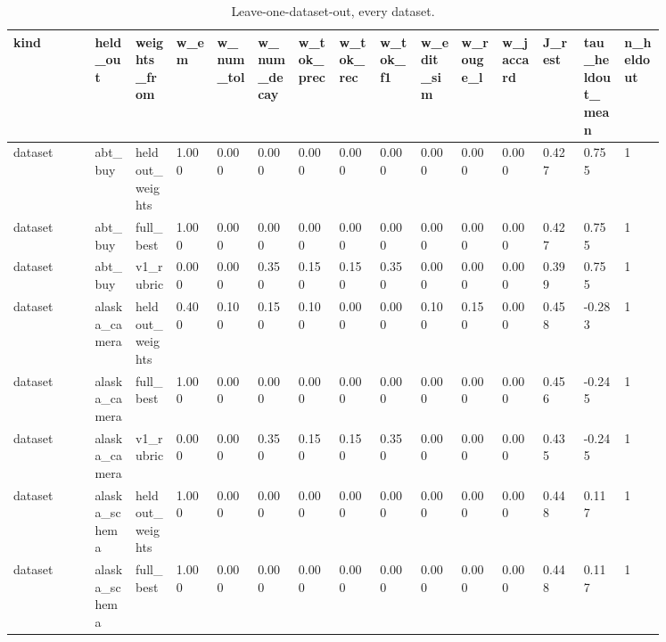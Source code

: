 \begin{landscape}
\tiny
\setlength{\tabcolsep}{3pt}
\begin{longtable}{p{0.105\linewidth}p{0.053\linewidth}p{0.053\linewidth}p{0.053\linewidth}p{0.053\linewidth}p{0.053\linewidth}p{0.053\linewidth}p{0.053\linewidth}p{0.053\linewidth}p{0.053\linewidth}p{0.053\linewidth}p{0.053\linewidth}p{0.053\linewidth}p{0.053\linewidth}p{0.053\linewidth}}
\caption{Leave-one-dataset-out, every dataset.}\label{tab:lodo_full}\\
\toprule
kind & held\_\allowbreak{}out & weights\_\allowbreak{}from & w\_\allowbreak{}em & w\_\allowbreak{}num\_\allowbreak{}tol & w\_\allowbreak{}num\_\allowbreak{}decay & w\_\allowbreak{}tok\_\allowbreak{}prec & w\_\allowbreak{}tok\_\allowbreak{}rec & w\_\allowbreak{}tok\_\allowbreak{}f1 & w\_\allowbreak{}edit\_\allowbreak{}sim & w\_\allowbreak{}rouge\_\allowbreak{}l & w\_\allowbreak{}jaccard & J\_\allowbreak{}rest & tau\_\allowbreak{}heldout\_\allowbreak{}mean & n\_\allowbreak{}heldout \\
\midrule
dataset & abt\_\allowbreak{}buy & heldout\_\allowbreak{}weights & 1.000 & 0.000 & 0.000 & 0.000 & 0.000 & 0.000 & 0.000 & 0.000 & 0.000 & 0.427 & 0.755 & 1 \\
dataset & abt\_\allowbreak{}buy & full\_\allowbreak{}best & 1.000 & 0.000 & 0.000 & 0.000 & 0.000 & 0.000 & 0.000 & 0.000 & 0.000 & 0.427 & 0.755 & 1 \\
dataset & abt\_\allowbreak{}buy & v1\_\allowbreak{}rubric & 0.000 & 0.000 & 0.350 & 0.150 & 0.150 & 0.350 & 0.000 & 0.000 & 0.000 & 0.399 & 0.755 & 1 \\
dataset & alaska\_\allowbreak{}camera & heldout\_\allowbreak{}weights & 0.400 & 0.100 & 0.150 & 0.100 & 0.000 & 0.000 & 0.100 & 0.150 & 0.000 & 0.458 & -0.283 & 1 \\
dataset & alaska\_\allowbreak{}camera & full\_\allowbreak{}best & 1.000 & 0.000 & 0.000 & 0.000 & 0.000 & 0.000 & 0.000 & 0.000 & 0.000 & 0.456 & -0.245 & 1 \\
dataset & alaska\_\allowbreak{}camera & v1\_\allowbreak{}rubric & 0.000 & 0.000 & 0.350 & 0.150 & 0.150 & 0.350 & 0.000 & 0.000 & 0.000 & 0.435 & -0.245 & 1 \\
dataset & alaska\_\allowbreak{}schema & heldout\_\allowbreak{}weights & 1.000 & 0.000 & 0.000 & 0.000 & 0.000 & 0.000 & 0.000 & 0.000 & 0.000 & 0.448 & 0.117 & 1 \\
dataset & alaska\_\allowbreak{}schema & full\_\allowbreak{}best & 1.000 & 0.000 & 0.000 & 0.000 & 0.000 & 0.000 & 0.000 & 0.000 & 0.000 & 0.448 & 0.117 & 1 \\

\end{longtable}
\end{landscape}
